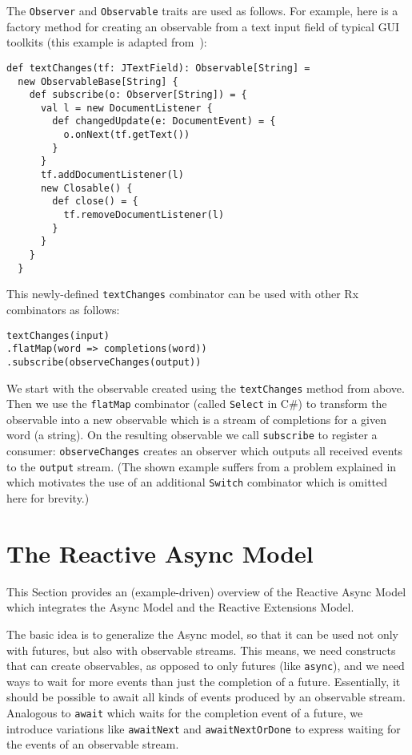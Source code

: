 \documentclass{acm_proc_article-sp}
\begin{document}
The \verb|Observer| and \verb|Observable| traits are used as follows. For
example, here is a factory method for creating an observable from a text input
field of typical GUI toolkits (this example is adapted from~\cite{RxCACM}):

\lstset{numbers=none,xleftmargin=0em}
\begin{lstlisting}
def textChanges(tf: JTextField): Observable[String] =
  new ObservableBase[String] {
    def subscribe(o: Observer[String]) = {
      val l = new DocumentListener {
        def changedUpdate(e: DocumentEvent) = {
          o.onNext(tf.getText())
        }
      }
      tf.addDocumentListener(l)
      new Closable() {
        def close() = {
          tf.removeDocumentListener(l)
        }
      }
    }
  }
\end{lstlisting}

This newly-defined \verb|textChanges| combinator can be used with other Rx
combinators as follows:

\begin{lstlisting}
textChanges(input)
.flatMap(word => completions(word))
.subscribe(observeChanges(output))
\end{lstlisting}

We start with the observable created using the \verb|textChanges| method from
above. Then we use the \verb|flatMap| combinator (called \verb|Select| in C\#)
to transform the observable into a new observable which is a stream of
completions for a given word (a string). On the resulting observable we call
\verb|subscribe| to register a consumer: \verb|observeChanges| creates an
observer which outputs all received events to the \verb|output| stream. (The
shown example suffers from a problem explained in~\cite{RxCACM} which
motivates the use of an additional \verb|Switch| combinator which is omitted
here for brevity.)


\section{The Reactive Async Model}

This Section provides an (example-driven) overview of the Reactive Async Model
which integrates the Async Model and the Reactive Extensions Model.

The basic idea is to generalize the Async model, so that it can be used not
only with futures, but also with observable streams. This means, we need
constructs that can create observables, as opposed to only futures (like
\verb|async|), and we need ways to wait for more events than just the
completion of a future. Essentially, it should be possible to await all kinds
of events produced by an observable stream. Analogous to \verb|await| which
waits for the completion event of a future, we introduce variations like
\verb|awaitNext| and \verb|awaitNextOrDone| to express waiting for the events
of an observable stream.
\end{document}
